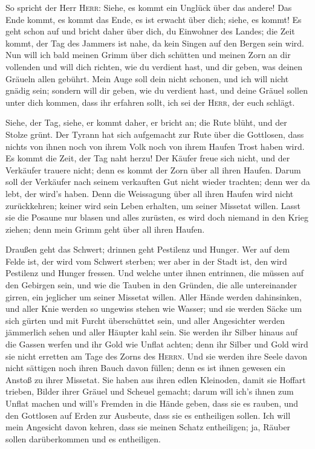  So spricht der Herr \textsc{Herr}: Siehe, es kommt ein
Unglück über das andere!  Das Ende kommt, es kommt das
Ende, es ist erwacht über dich; siehe, es kommt!  Es geht
schon auf und bricht daher über dich, du Einwohner des Landes; die Zeit
kommt, der Tag des Jammers ist nahe, da kein Singen auf den Bergen sein
wird.  Nun will ich bald meinen Grimm über dich schütten
und meinen Zorn an dir vollenden und will dich richten, wie du verdient
hast, und dir geben, was deinen Gräueln allen gebührt. 
Mein Auge soll dein nicht schonen, und ich will nicht gnädig sein;
sondern will dir geben, wie du verdient hast, und deine Gräuel sollen
unter dich kommen, dass ihr erfahren sollt, ich sei der \textsc{Herr},
der euch schlägt.

 Siehe, der Tag, siehe, er kommt daher, er bricht an; die
Rute blüht, und der Stolze grünt.  Der Tyrann hat sich
aufgemacht zur Rute über die Gottlosen, dass nichts von ihnen noch von
ihrem Volk noch von ihrem Haufen Trost haben wird.  Es
kommt die Zeit, der Tag naht herzu! Der Käufer freue sich nicht, und der
Verkäufer trauere nicht; denn es kommt der Zorn über all ihren Haufen.
 Darum soll der Verkäufer nach seinem verkauften Gut
nicht wieder trachten; denn wer da lebt, der wird's haben. Denn die
Weissagung über all ihren Haufen wird nicht zurückkehren; keiner wird
sein Leben erhalten, um seiner Missetat willen.  Lasst
sie die Posaune nur blasen und alles zurüsten, es wird doch niemand in
den Krieg ziehen; denn mein Grimm geht über all ihren Haufen.

 Draußen geht das Schwert; drinnen geht Pestilenz und
Hunger. Wer auf dem Felde ist, der wird vom Schwert sterben; wer aber in
der Stadt ist, den wird Pestilenz und Hunger fressen. 
Und welche unter ihnen entrinnen, die müssen auf den Gebirgen sein, und
wie die Tauben in den Gründen, die alle untereinander girren, ein
jeglicher um seiner Missetat willen.  Aller Hände werden
dahinsinken, und aller Knie werden so ungewiss stehen wie Wasser;
 und sie werden Säcke um sich gürten und mit Furcht
überschüttet sein, und aller Angesichter werden jämmerlich sehen und
aller Häupter kahl sein.  Sie werden ihr Silber hinaus
auf die Gassen werfen und ihr Gold wie Unflat achten; denn ihr Silber
und Gold wird sie nicht erretten am Tage des Zorns des \textsc{Herrn}.
Und sie werden ihre Seele davon nicht sättigen noch ihren Bauch davon
füllen; denn es ist ihnen gewesen ein Anstoß zu ihrer Missetat.
 Sie haben aus ihren edlen Kleinoden, damit sie Hoffart
trieben, Bilder ihrer Gräuel und Scheuel gemacht; darum will ich's ihnen
zum Unflat machen  und will's Fremden in die Hände geben,
dass sie es rauben, und den Gottlosen auf Erden zur Ausbeute, dass sie
es entheiligen sollen.  Ich will mein Angesicht davon
kehren, dass sie meinen Schatz entheiligen; ja, Räuber sollen
darüberkommen und es entheiligen.

